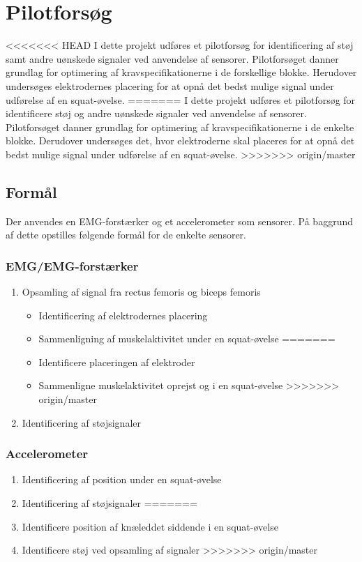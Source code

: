 \section{Pilotforsøg}
<<<<<<< HEAD
I dette projekt udføres et pilotforsøg for identificering af støj samt andre uønskede signaler ved anvendelse af sensorer. Pilotforsøget danner grundlag for optimering af kravspecifikationerne i de forskellige blokke. Herudover undersøges elektrodernes placering for at opnå det bedst mulige signal under udførelse af en squat-øvelse.
=======
I dette projekt udføres et pilotforsøg for identificere støj og andre uønskede signaler ved anvendelse af sensorer. Pilotforsøget danner grundlag for optimering af kravspecifikationerne i de enkelte blokke. Derudover undersøges det, hvor elektroderne skal placeres for at opnå det bedst mulige signal under udførelse af en squat-øvelse.
>>>>>>> origin/master

\subsection{Formål}
Der anvendes en EMG-forstærker og et accelerometer som sensorer. På baggrund af dette opstilles følgende formål for de enkelte sensorer.  

\subsubsection{EMG/EMG-forstærker}
\begin{enumerate}
\item Opsamling af signal fra rectus femoris og biceps femoris
\begin{itemize}
<<<<<<< HEAD
\item Identificering af elektrodernes placering
\item Sammenligning af muskelaktivitet under en squat-øvelse 
=======
\item Identificere placeringen af elektroder
\item Sammenligne muskelaktivitet oprejst og i en squat-øvelse 
>>>>>>> origin/master
\end{itemize}
\item Identificering af støjsignaler
\end{enumerate}


\subsubsection{Accelerometer}
\begin{enumerate}
<<<<<<< HEAD
\item Identificering af position under en squat-øvelse
\item Identificering af støjsignaler
=======
\item Identificere position af knæleddet siddende i en squat-øvelse
\item Identificere støj ved opsamling af signaler
>>>>>>> origin/master
\end{enumerate}


